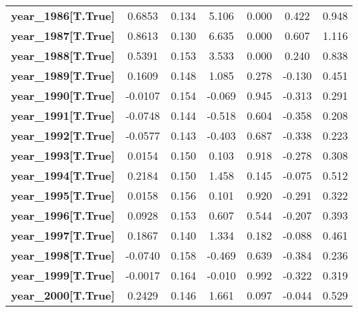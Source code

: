 \begin{center}
\begin{tabular}{lcccccc}
\textbf{year\_1986[T.True]} &       0.6853  &        0.134     &     5.106  &         0.000        &        0.422    &        0.948     \\
\textbf{year\_1987[T.True]} &       0.8613  &        0.130     &     6.635  &         0.000        &        0.607    &        1.116     \\
\textbf{year\_1988[T.True]} &       0.5391  &        0.153     &     3.533  &         0.000        &        0.240    &        0.838     \\
\textbf{year\_1989[T.True]} &       0.1609  &        0.148     &     1.085  &         0.278        &       -0.130    &        0.451     \\
\textbf{year\_1990[T.True]} &      -0.0107  &        0.154     &    -0.069  &         0.945        &       -0.313    &        0.291     \\
\textbf{year\_1991[T.True]} &      -0.0748  &        0.144     &    -0.518  &         0.604        &       -0.358    &        0.208     \\
\textbf{year\_1992[T.True]} &      -0.0577  &        0.143     &    -0.403  &         0.687        &       -0.338    &        0.223     \\
\textbf{year\_1993[T.True]} &       0.0154  &        0.150     &     0.103  &         0.918        &       -0.278    &        0.308     \\
\textbf{year\_1994[T.True]} &       0.2184  &        0.150     &     1.458  &         0.145        &       -0.075    &        0.512     \\
\textbf{year\_1995[T.True]} &       0.0158  &        0.156     &     0.101  &         0.920        &       -0.291    &        0.322     \\
\textbf{year\_1996[T.True]} &       0.0928  &        0.153     &     0.607  &         0.544        &       -0.207    &        0.393     \\
\textbf{year\_1997[T.True]} &       0.1867  &        0.140     &     1.334  &         0.182        &       -0.088    &        0.461     \\
\textbf{year\_1998[T.True]} &      -0.0740  &        0.158     &    -0.469  &         0.639        &       -0.384    &        0.236     \\
\textbf{year\_1999[T.True]} &      -0.0017  &        0.164     &    -0.010  &         0.992        &       -0.322    &        0.319     \\
\textbf{year\_2000[T.True]} &       0.2429  &        0.146     &     1.661  &         0.097        &       -0.044    &        0.529     \\

\end{tabular}
\end{center}
